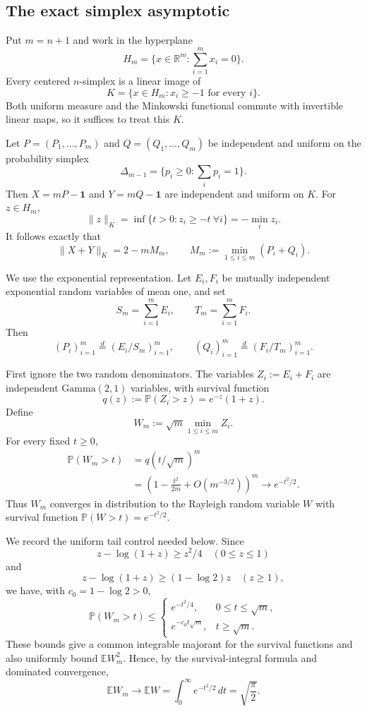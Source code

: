 \documentclass[11pt]{article}
\newcommand{\E}{\mathbb E}
\newcommand{\Pp}{\mathbb P}
\newcommand{\R}{\mathbb R}
\newcommand{\one}{\mathbf 1}
\begin{document}
\subsection{The exact simplex asymptotic}

Put $m=n+1$ and work in the hyperplane
\[
 H_m=\{x\in\R^m:\textstyle\sum_{i=1}^m x_i=0\}.
\]
Every centered $n$-simplex is a linear image of
\[
 K=\{x\in H_m:x_i\ge -1\text{ for every }i\}.
\]
Both uniform measure and the Minkowski functional commute with invertible
linear maps, so it suffices to treat this $K$.

Let $P=(P_1,\ldots,P_m)$ and $Q=(Q_1,\ldots,Q_m)$ be independent and uniform
on the probability simplex
\[
 \Delta_{m-1}=\{p_i\ge0:\textstyle\sum_i p_i=1\}.
\]
Then $X=mP-\one$ and $Y=mQ-\one$ are independent and uniform on $K$.  For
$z\in H_m$,
\[
 \|z\|_K=\inf\{t>0:z_i\ge-t\ \forall i\}=-\min_i z_i.
\]
It follows exactly that
\begin{equation}\label{eq:gaugeidentity}
 \|X+Y\|_K=2-mM_m,
 \qquad
 M_m:=\min_{1\le i\le m}(P_i+Q_i).
\end{equation}

We use the exponential representation.  Let $E_i,F_i$ be mutually
independent exponential random variables of mean one, and set
\[
 S_m=\sum_{i=1}^m E_i,\qquad T_m=\sum_{i=1}^m F_i.
\]
Then
\[
 (P_i)_{i=1}^m\stackrel d=(E_i/S_m)_{i=1}^m,
 \qquad
 (Q_i)_{i=1}^m\stackrel d=(F_i/T_m)_{i=1}^m.
\]

First ignore the two random denominators.  The variables
$Z_i:=E_i+F_i$ are independent $\mathrm{Gamma}(2,1)$ variables, with survival
function
\[
 q(z):=\Pp(Z_i>z)=e^{-z}(1+z).
\]
Define
\[
 W_m:=\sqrt m\min_{1\le i\le m}Z_i.
\]
For every fixed $t\ge0$,
\begin{align*}
 \Pp(W_m>t)
 &=q(t/\sqrt m)^m\\
 &=\left(1-\frac{t^2}{2m}+O(m^{-3/2})\right)^m
 \longrightarrow e^{-t^2/2}.
\end{align*}
Thus $W_m$ converges in distribution to the Rayleigh random variable $W$
with survival function $\Pp(W>t)=e^{-t^2/2}$.

We record the uniform tail control needed below.  Since
\[
 z-\log(1+z)\ge z^2/4\quad(0\le z\le1)
\]
and
\[
 z-\log(1+z)\ge(1-\log2)z\quad(z\ge1),
\]
we have, with $c_0=1-\log2>0$,
\begin{equation}\label{eq:tails}
 \Pp(W_m>t)\le
 \begin{cases}
   e^{-t^2/4},&0\le t\le\sqrt m,\\
   e^{-c_0t\sqrt m},&t\ge\sqrt m.
 \end{cases}
\end{equation}
These bounds give a common integrable majorant for the survival functions
and also uniformly bound $\E W_m^2$.  Hence, by the survival-integral
formula and dominated convergence,
\begin{equation}\label{eq:Wmean}
 \E W_m\longrightarrow \E W
 =\int_0^\infty e^{-t^2/2}\,dt
 =\sqrt{\frac\pi2}.
\end{equation}
\end{document}
